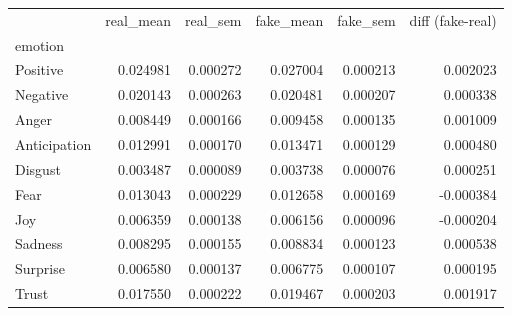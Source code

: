 \begin{tabular}{lrrrrr}
\toprule
 & real_mean & real_sem & fake_mean & fake_sem & diff (fake-real) \\
emotion &  &  &  &  &  \\
\midrule
Positive & 0.024981 & 0.000272 & 0.027004 & 0.000213 & 0.002023 \\
Negative & 0.020143 & 0.000263 & 0.020481 & 0.000207 & 0.000338 \\
Anger & 0.008449 & 0.000166 & 0.009458 & 0.000135 & 0.001009 \\
Anticipation & 0.012991 & 0.000170 & 0.013471 & 0.000129 & 0.000480 \\
Disgust & 0.003487 & 0.000089 & 0.003738 & 0.000076 & 0.000251 \\
Fear & 0.013043 & 0.000229 & 0.012658 & 0.000169 & -0.000384 \\
Joy & 0.006359 & 0.000138 & 0.006156 & 0.000096 & -0.000204 \\
Sadness & 0.008295 & 0.000155 & 0.008834 & 0.000123 & 0.000538 \\
Surprise & 0.006580 & 0.000137 & 0.006775 & 0.000107 & 0.000195 \\
Trust & 0.017550 & 0.000222 & 0.019467 & 0.000203 & 0.001917 \\
\bottomrule
\end{tabular}
